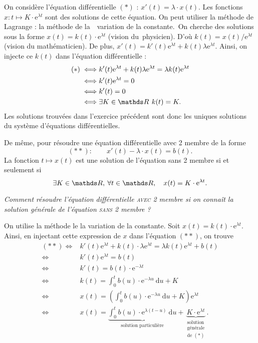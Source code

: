 \begin{rmkn}
	On considère l'équation différentielle $(*)$ : $x'(t) = \lambda \cdot x(t)$.
	Les fonctions $x : t \mapsto K\cdot \mathrm{e}^{\lambda t}$\/ sont des solutions de cette équation. On peut utiliser la méthode de {\sc Lagrange}\/ : la méthode de la~\guillemotleft~variation de la constante.~\guillemotright\@ On cherche des solutions sous la forme $x(t) = k(t) \cdot \mathrm{e}^{\lambda t}$ (vision du~physicien). D'où $k(t) = x(t) / \mathrm{e}^{\lambda t}$\/ (vision du mathématicien). De plus, $x'(t) = k'(t) \mathrm{e}^{\lambda t} + k(t) \lambda \mathrm{e}^{\lambda t}$.
	Ainsi, on injecte ce $k(t)$\/ dans l'équation différentielle :
	\begin{align*}
		(*) \iff& k'(t) \mathrm{e}^{\lambda t} + k(t) \lambda \mathrm{e}^{\lambda t} = \lambda k(t)\mathrm{e}^{\lambda t}\\
		\iff& k'(t) \mathrm{e}^{\lambda t} = 0\\
		\iff& k'(t) = 0\\
		\iff& \exists K \in \R\,\:k(t) = K.
	\end{align*}
	Les solutions trouvées dans l'exercice précédent sont donc les uniques solutions du système d'équations différentielles.

	De même, pour résoudre une équation différentielle avec 2 membre de la forme \[
		(**) : \qquad x'(t) - \lambda \cdot x(t) = b(t)
	.\]
	La fonction $t \mapsto x(t)$\/ est une solution de l'équation {\sc sans}\/ 2 membre si et seulement si \[
		\exists K \in \R,\:\forall t \in \R,\quad x(t) = K \cdot \mathrm{e}^{\lambda t}
	.\]
	\begin{center}
		\slshape Comment résoudre l'équation différentielle {\scshape avec}\/ 2 membre si on connaît la solution générale de l'équation {\scshape sans}\/ 2 membre ?
	\end{center}
	On utilise la méthode le la variation de la constante.
	Soit $x(t) = k(t) \cdot \mathrm{e}^{\lambda t}$. Ainsi, en injectant cette expression de $x$\/ dans l'équation $(**)$, on trouve
	\begin{align*}
		(**) \iff& k'(t) \mathrm{e}^{\lambda t} + k(t) \cdot \lambda \mathrm{e}^{\lambda t} = \lambda k(t) \mathrm{e}^{\lambda t} + b(t)\\
		\iff& k'(t) \mathrm{e}^{\lambda t} = b(t)\\
		\iff& k'(t) = b(t) \cdot \mathrm{e}^{-\lambda t}\\
		\iff& k(t) = \int_{0}^{t} b(u)\cdot \mathrm{e}^{-\lambda u}~\mathrm{d}u + K\\
		\iff& x(t) = \left( \int_{0}^{t} b(u) \cdot \mathrm{e}^{-\lambda u}~\mathrm{d}u + K \right) \mathrm{e}^{\lambda t}\\
		\iff& x(t) = \underbrace{\int_{0}^{t} b(u) \cdot \mathrm{e}^{\lambda (t-u)}~\mathrm{d}u}_{\text{solution particulière}} + \underbrace{K \cdot \mathrm{e}^{\lambda t}}_{\substack{\text{solution}\\\text{générale}\\\text{de $(*)$}}}.
	\end{align*}
\end{rmkn}
